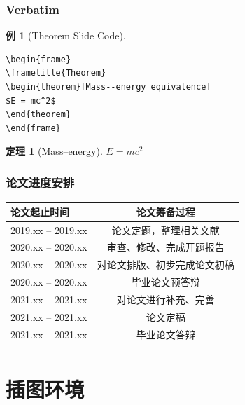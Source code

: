 \documentclass[11pt,compress]{beamer}
\newtheorem{thm}{定理}
\numberwithin{thm}{section}
\numberwithin{defn}{section}
\numberwithin{lmm}{section}
\theoremstyle{example}
\newtheorem{exam}{例}
\numberwithin{figure}{section}
\numberwithin{table}{section}
\numberwithin{equation}{section}
\begin{document}
\begin{frame}[fragile] %
\frametitle{Verbatim}
\begin{exam}[Theorem Slide Code]
\begin{verbatim}
\begin{frame}
\frametitle{Theorem}
\begin{theorem}[Mass--energy equivalence]
$E = mc^2$
\end{theorem}
\end{frame}\end{verbatim}
\end{exam}

\begin{thm}[Mass--energy] \upshape
$E = mc^2$
\end{thm}

\end{frame}


\begin{frame}
\frametitle{论文进度安排}
\begin{table}[htp!]
\centering
\renewcommand\arraystretch{1.3} %
\begin{tabularx}{0.92\textwidth}{|P{3.2cm}|C|}
\Xhline{2\arrayrulewidth}
论文起止时间       &  论文筹备过程\\
\hline
2019.xx -- 2019.xx    &  论文定题，整理相关文献\\
\hline
2020.xx -- 2020.xx    &  审查、修改、完成开题报告\\
\hline
2020.xx -- 2020.xx   &  对论文排版、初步完成论文初稿\\
\hline
2020.xx -- 2020.xx    &  毕业论文预答辩\\
\hline
2021.xx -- 2021.xx    &  对论文进行补充、完善\\
\hline
2021.xx -- 2021.xx    &  论文定稿\\
\hline
2021.xx -- 2021.xx    &  毕业论文答辩\\
\Xhline{2\arrayrulewidth}
\end{tabularx}
\end{table}

\end{frame}



\section{插图环境}
\end{document}
